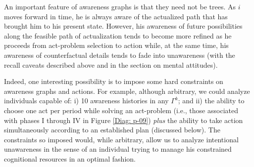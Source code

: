 \documentclass[
11pt,
titlepage,
reqno,
]{article}%
\theoremstyle{definition}
\begin{document}
An important feature of awareness graphs is that they need not be trees. 
As $i$ moves forward in time, he is always aware of the actualized path that has brought him to his present state.
However, his awareness of future possibilities along the feasible path of actualization tends to become more refined as he proceeds from act-problem selection to action while, at the same time, his awareness of counterfactual details tends to fade into unawareness (with the recall caveats described above and in the section on mental attitudes).

Indeed, one interesting possibility is to impose some hard constraints on awareness graphs and actions. 
For example, although arbitrary, we could analyze individuals capable of: i) 10 awareness histories in any $\Gamma^k$; and ii) the ability to choose one act per period while solving an act-problem (i.e., those associated with phases I through IV  in Figure \ref{Diag: p-09}) \textit{plus} the ability to take action simultaneously according to an established plan (discussed below).
The constraints so imposed would, while arbitrary, allow us to analyze intentional unawareness in the sense of an individual  trying to manage his constrained cognitional resources in an optimal fashion.
	
\end{document}
